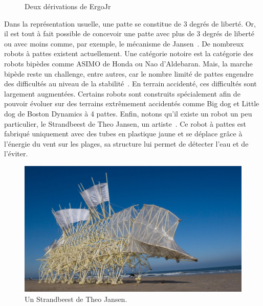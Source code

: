 \begin{figure}[!h]
\begin{subfigure}{0.495\linewidth}
                    \label{fig:doggy}
                    \end{subfigure}
                    \caption[Robot à pattes, Quattro et Doggy]{Deux dérivations de ErgoJr}\label{fig:bot_patte}
                \end{figure}\par%
                Dans la représentation usuelle, une patte se constitue de 3 degrés de liberté. Or, il est tout à fait possible de concevoir une patte avec plus de 3 degrés de liberté~ ou avec moins comme, par exemple, le mécanisme de Jansen~.
                De nombreux robots à pattes existent actuellement. Une catégorie notoire est la catégorie des robots bipèdes comme ASIMO de Honda ou Nao d'Aldebaran. Mais, la marche bipède reste un challenge, entre autres, car le nombre limité de pattes engendre des difficultés au niveau de la stabilité~. En terrain accidenté, ces difficultés sont largement augmentées. Certains robots sont construits spécialement afin de pouvoir évoluer sur des terrains extrêmement accidentés comme Big dog et Little dog de Boston Dynamics à 4 pattes.
                Enfin, notons qu'il existe un robot un peu particulier, le Strandbeest de Theo Jansen, un artiste~. Ce robot à pattes est fabriqué uniquement avec des tubes en plastique jaune et se déplace grâce à l'énergie du vent sur les plages, sa structure lui permet de détecter l'eau et de l'éviter.
                \begin{figure}[!h]
                    \centering
                    \includegraphics[width=\linewidth]{Figures/bot-standbeest}
                    \caption{Un Strandbeest de Theo Jansen.}\label{fig:strandbeest}
                \end{figure}\par%
